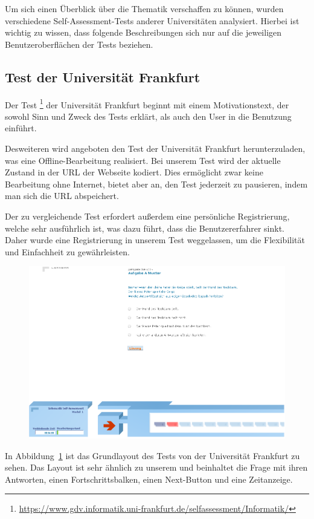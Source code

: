 \label{Jonas}
Um sich einen Überblick über die Thematik verschaffen zu können, wurden verschiedene Self-Assessment-Tests anderer Universitäten analysiert.
Hierbei ist wichtig zu wissen, dass folgende Beschreibungen sich nur auf die jeweiligen Benutzeroberflächen der Tests beziehen.

\subsection{Test der Universität Frankfurt}
Der Test
\footnote{\url{https://www.gdv.informatik.uni-frankfurt.de/selfassessment/Informatik/}} 
der Universität Frankfurt beginnt mit einem Motivationstext, der sowohl Sinn und Zweck des Tests erklärt, als auch den User in die Benutzung einführt.

Desweiteren wird angeboten den Test der Universität Frankfurt herunterzuladen, was eine Offline-Bearbeitung realisiert. 
Bei unserem Test wird der aktuelle Zustand in der URL der Webseite kodiert. 
Dies ermöglicht zwar keine Bearbeitung ohne Internet, bietet aber an, den Test jederzeit zu pausieren, indem man sich die URL abspeichert.

Der zu vergleichende Test erfordert außerdem eine persönliche Registrierung, welche sehr ausführlich ist, was dazu führt, dass die Benutzererfahrer sinkt. Daher wurde eine Registrierung in unserem Test weggelassen, um die Flexibilität und Einfachheit zu gewährleisten.  
\begin{figure} 
  \centering
     \includegraphics[width=\textwidth]{Jonas_Images/frankfurt1.png}
  \caption{}
  \label{fig:Bild1}
\end{figure}
In Abbildung~\ref{fig:Bild1} ist das Grundlayout des Tests von der Universität Frankfurt zu sehen. 
Das Layout ist sehr ähnlich zu unserem und beinhaltet die Frage mit ihren Antworten, einen Fortschrittsbalken, einen Next-Button und eine Zeitanzeige.


